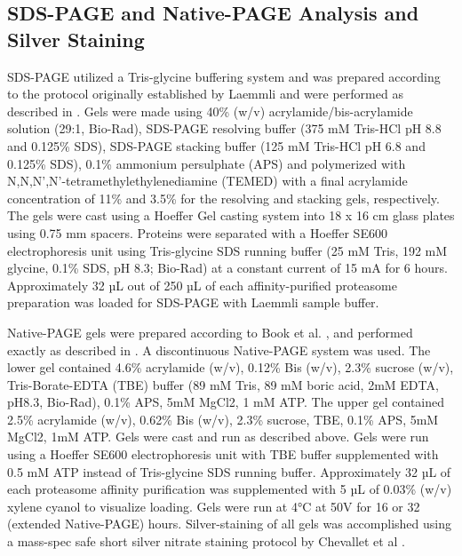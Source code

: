 \subsection{SDS-PAGE and Native-PAGE Analysis and Silver Staining}
	SDS-PAGE utilized a Tris-glycine buffering system and was prepared according to the protocol originally established by Laemmli \citep{laemmli70} and were performed as described in . Gels were made using 40\% (w/v) acrylamide/bis-acrylamide solution (29:1, Bio-Rad), SDS-PAGE resolving buffer (375 mM Tris-HCl pH 8.8 and 0.125\% SDS), SDS-PAGE stacking buffer (125 mM Tris-HCl pH 6.8 and 0.125\% SDS), 0.1\% ammonium persulphate (APS) and polymerized with N,N,N’,N’-tetramethylethylenediamine (TEMED) with a final acrylamide concentration of 11\% and 3.5\% for the resolving and stacking gels, respectively. The gels were cast using a Hoeffer Gel casting system into 18 x 16 cm glass plates using 0.75 mm spacers. Proteins were separated with a Hoeffer SE600 electrophoresis unit using Tris-glycine SDS running buffer (25 mM Tris, 192 mM glycine, 0.1\% SDS, pH 8.3; Bio-Rad) at a constant current of 15 mA for 6 hours. Approximately 32 µL out of 250 µL of each affinity-purified proteasome preparation was loaded for SDS-PAGE with Laemmli sample buffer.
	 	 
	Native-PAGE gels were prepared according to Book et al. \citep{book10}, and performed exactly as described in . A discontinuous Native-PAGE system was used. The lower gel contained 4.6\% acrylamide (w/v), 0.12\% Bis (w/v), 2.3\% sucrose (w/v), Tris-Borate-EDTA (TBE) buffer (89 mM Tris, 89 mM boric acid, 2mM EDTA, pH8.3, Bio-Rad), 0.1\% APS, 5mM MgCl2, 1 mM ATP. The upper gel contained 2.5\% acrylamide (w/v), 0.62\% Bis (w/v), 2.3\% sucrose, TBE, 0.1\% APS, 5mM MgCl2, 1mM ATP. Gels were cast and run as described above. Gels were run using a Hoeffer SE600 electrophoresis unit with TBE buffer supplemented with 0.5 mM ATP instead of Tris-glycine SDS running buffer. Approximately 32 µL of each proteasome affinity purification was supplemented with 5 µL of 0.03\% (w/v) xylene cyanol to visualize loading. Gels were run at 4°C at 50V for 16 or 32 (extended Native-PAGE) hours. Silver-staining of all gels was accomplished using a mass-spec safe short silver nitrate staining protocol by Chevallet et al .

